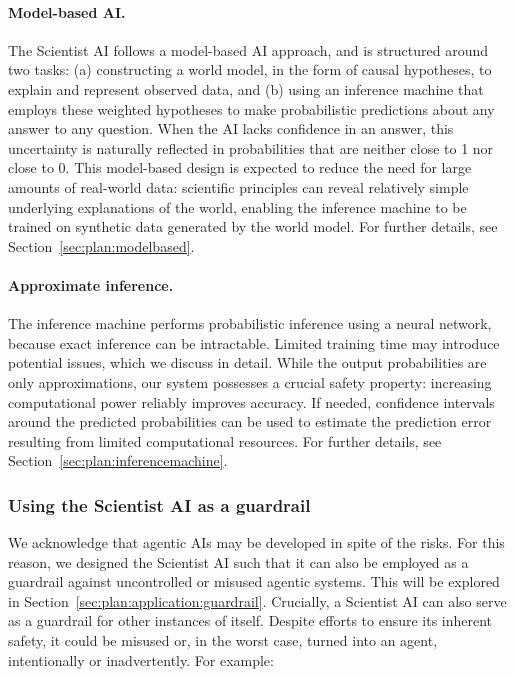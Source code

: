 \paragraph{Model-based AI.} The Scientist AI follows a model-based AI approach, and is structured around two tasks: (a) constructing a world model, in the form of causal hypotheses, to explain and represent observed data, and (b) using an inference machine that employs these weighted hypotheses to make probabilistic predictions about any answer to any question. When the AI lacks confidence in an answer, this uncertainty is naturally reflected in probabilities that are neither close to 1 nor close to 0. This model-based design is expected to reduce the need for large amounts of real-world data: scientific principles can reveal relatively simple underlying explanations of the world, enabling the inference machine to be trained on synthetic data generated by the world model. For further details, see Section~\ref{sec:plan:modelbased}.

\paragraph{Approximate inference.} The inference machine performs probabilistic inference using a neural network, because exact inference can be intractable. Limited training time may introduce potential issues, which we discuss in detail. While the output probabilities are only approximations, our system possesses a crucial safety property: increasing computational power reliably improves accuracy. If needed, confidence intervals around the predicted probabilities can be used to estimate the prediction error resulting from limited computational resources. For further details, see Section~\ref{sec:plan:inferencemachine}.

\subsubsection{Using the Scientist AI as a guardrail}

We acknowledge that agentic AIs may be developed in spite of the risks. For this reason, we designed the Scientist AI such that it can also be employed as a guardrail against uncontrolled or misused agentic systems. This will be explored in Section~\ref{sec:plan:application:guardrail}. Crucially, a Scientist AI can also serve as a guardrail for other instances of itself. Despite efforts to ensure its inherent safety, it could be misused or, in the worst case, turned into an agent, intentionally or inadvertently. For example:

